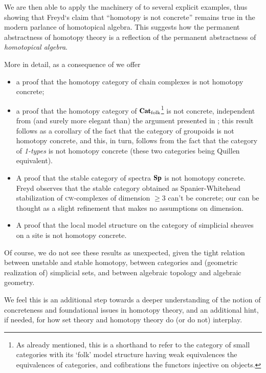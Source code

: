 \documentclass[a4paper, 10pt]{amsart}
\begin{document}
We are then able to apply the machinery of \athm{} to several
explicit examples, thus showing that Freyd`s claim that ``homotopy is not
concrete'' remains true in the modern parlance of homotopical algebra. This
suggests how the permanent abstractness of homotopy theory is a reflection of
the permanent abstractness of \emph{homotopical algebra}.

More in detail, as a consequence of \athm{} we offer
\begin{itemize}
	\item a proof that the homotopy category of chain complexes is not homotopy concrete;
	\item a proof that the homotopy category of $\Cat_\text{folk}$\footnote{As
already mentioned, this is a shorthand to refer to the category of small
categories with its `folk' model structure having weak equivalences the
equivalences of categories, and cofibrations the functors injective on objects.}
is not concrete, independent from (and surely more elegant than) the argument
presented in \cite[§4.1]{fconc}; this result follows as a corollary of the fact
that the category of groupoids is not homotopy concrete, and this, in turn,
follows from the fact that the category of \emph{1-types} is not homotopy
concrete (these two categories being Quillen equivalent).
	\item A proof that the stable category of spectra $\cate{Sp}$ is not homotopy
concrete. Freyd \cite{Freydconc} observes that the stable category obtained as
Spanier-Whitehead stabilization of \textsc{cw}-complexes of dimension $\ge 3$
can't be concrete; our  can be thought as a slight refinement
that makes no assumptions on dimension.
	\item A proof that the local model structure
\cite{jardine1987simplical,dugger2004hypercovers} on the category of simplicial
sheaves on a site is not homotopy concrete.
\end{itemize}
Of course, we do not see these results as unexpected, given the tight relation
between unstable and stable homotopy, between categories and (geometric
realization of) simplicial sets, and between algebraic topology and algebraic
geometry.

We feel this is an additional step towards a deeper understanding of the notion
of concreteness and foundational issues in homotopy theory, and an additional
hint, if needed, for how set theory and homotopy theory do (or do not)
interplay.
\end{document}
